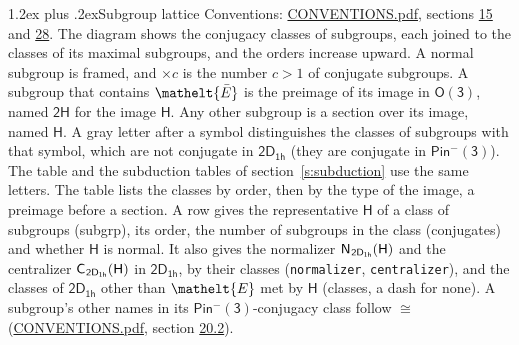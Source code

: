 \documentclass[10pt,a4paper]{article}
\makeatletter
\renewcommand\section{\@startsection{section}{1}{\z@}{-3ex plus -1ex minus -.2ex}%
  {1.2ex plus .2ex}{\normalfont\large\sffamily\bfseries\color{parttitle}}}
\numberwithin{equation}{section}
\newcommand{\eltfont}[1]{{\let\sigma\eltsigma\mathelt{#1}}}
\newcommand{\grp}[1]{\mathsf{#1}}
\newcommand{\cls}[1]{\eltfont{#1}}
\newcommand{\elt}[1]{\eltfont{#1}}
\newcommand{\samecls}{\cong}
\newcommand{\clsletter}[1]{\,{\scriptsize\color{black!55}#1}}
\newcommand{\barred}[1]{\bar{#1}}
\newcommand{\hairsp}{\mkern1mu}
\makeatother
\begin{document}
\section{Subgroup lattice}\label{s:subgroups}
Conventions: \href{../../CONVENTIONS.pdf}{CONVENTIONS.pdf}, sections \href{../../../rotation/CONVENTIONS.pdf\#conv.15}{15} and \href{../../CONVENTIONS.pdf\#conv.28}{28}.
The diagram shows the conjugacy classes of subgroups, each joined to the classes of its maximal subgroups, and the orders increase upward. \label{n:index.conjugates.c}A normal subgroup is framed, and ${\times}c$ is the number $c > 1$ of conjugate subgroups. \label{n:group.H}A subgroup that contains $\elt{\barred{E}}$ is the preimage of its image in $\grp{O(3)}$, named $\grp{2H}$ for the image $\grp{H}$. Any other subgroup is a section over its image, named $\grp{H}$. \label{n:mark.letter}A gray letter after a symbol distinguishes the classes of subgroups with that symbol, which are not conjugate in $\grp{2D_{1h}}$ (they are conjugate in \href{Pinminus3.pdf}{$\grp{Pin^{-}(3)}$}). The table and the subduction tables of section~\ref{s:subduction} use the same letters. The table lists the classes by order, then by the type of the image, a preimage before a section. \label{n:head.subgroup}\label{n:head.order}\label{n:head.conjugates}\label{n:head.normal}A row gives the representative $\grp{H}$ of a class of subgroups (subgrp), its order, the number of subgroups in the class (conjugates) and whether $\grp{H}$ is normal. \label{n:group.normalizer}\label{n:group.centralizer}\label{n:head.classes}It also gives the normalizer $\grp{N}_{\hairsp \grp{2D_{1h}}}(\grp{H})$ and the centralizer $\grp{C}_{\hairsp \grp{2D_{1h}}}(\grp{H})$ in $\grp{2D_{1h}}$, by their classes (\texttt{normalizer}, \texttt{centralizer}), and the classes of $\grp{2D_{1h}}$ other than $\cls{E}$ met by $\grp{H}$ (classes, a dash for none). A subgroup's other names in its \href{Pinminus3.pdf}{$\grp{Pin^{-}(3)}$}-conjugacy class follow $\samecls$ (\href{../../CONVENTIONS.pdf}{CONVENTIONS.pdf}, section \href{../../CONVENTIONS.pdf\#conv.20.2}{20.2}).
\begin{center}
\end{center}
\end{document}
